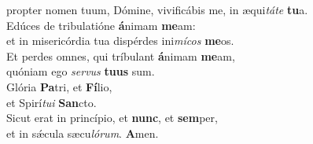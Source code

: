\evenverse propter nomen tuum, Dómine, vivificábis me, in æqui\textit{tá}\textit{te} \textbf{tu}a.\\
\oddverse Edúces de tribulatióne \textbf{á}nimam \textbf{me}am:~\*\\
\oddverse et in misericórdia tua dispérdes ini\textit{mí}\textit{cos} \textbf{me}os.\\
\evenverse Et perdes omnes, qui tríbulant \textbf{á}nimam \textbf{me}am,~\*\\
\evenverse quóniam ego \textit{ser}\textit{vus} \textbf{tu}\textbf{us} sum.\\
\oddverse Glória \textbf{Pa}tri, et \textbf{Fí}lio,~\*\\
\oddverse et Spirí\textit{tu}\textit{i} \textbf{San}cto.\\
\evenverse Sicut erat in princípio, et \textbf{nunc}, et \textbf{sem}per,~\*\\
\evenverse et in sǽcula sæcu\textit{ló}\textit{rum}. \textbf{A}men.\\
